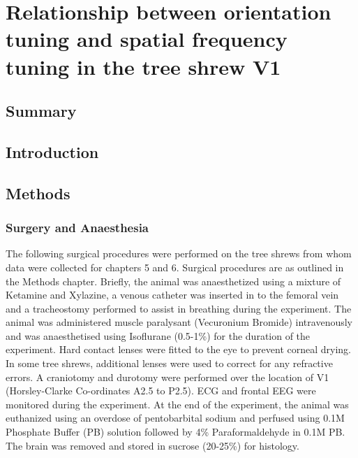 \chapter{Relationship between orientation tuning and spatial frequency tuning in the tree shrew V1}
\pagebreak
\section{Summary}
\pagebreak
\section{Introduction}
\section{Methods}


\subsection{Surgery and Anaesthesia}

The following surgical procedures were performed on the tree shrews from whom data were collected for chapters 5 and 6. Surgical procedures are as outlined in the Methods chapter. Briefly, the animal was anaesthetized using a mixture of Ketamine and Xylazine, a venous catheter was inserted in to the femoral vein and a tracheostomy performed to assist in breathing during the experiment. The animal was administered muscle paralysant (Vecuronium Bromide) intravenously and was anaesthetised using Isoflurane (0.5-1\%) for the duration of the experiment. Hard contact lenses were fitted to the eye to prevent corneal drying. In some tree shrews, additional lenses were used to correct for any refractive errors. A craniotomy and durotomy were performed over the location of V1 (Horsley-Clarke Co-ordinates A2.5 to P2.5). ECG and frontal EEG were monitored during the experiment. At the end of the experiment, the animal was euthanized using an overdose of pentobarbital sodium and perfused using 0.1M Phosphate Buffer (PB) solution followed by 4\% Paraformaldehyde in 0.1M PB. The brain was removed and stored in sucrose (20-25\%) for histology.

